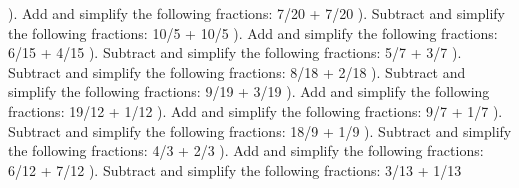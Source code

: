 \documentclass{article}%
\begin{document}
\newline%
\newline%
). Add and simplify the following fractions: 7/20 + 7/20%
\newline%
\newline%
). Subtract and simplify the following fractions: 10/5 + 10/5%
\newline%
\newline%
). Add and simplify the following fractions: 6/15 + 4/15%
\newline%
\newline%
). Subtract and simplify the following fractions: 5/7 + 3/7%
\newline%
\newline%
). Subtract and simplify the following fractions: 8/18 + 2/18%
\newline%
\newline%
). Subtract and simplify the following fractions: 9/19 + 3/19%
\newline%
\newline%
). Add and simplify the following fractions: 19/12 + 1/12%
\newline%
\newline%
). Add and simplify the following fractions: 9/7 + 1/7%
\newline%
\newline%
). Subtract and simplify the following fractions: 18/9 + 1/9%
\newline%
\newline%
). Subtract and simplify the following fractions: 4/3 + 2/3%
\newline%
\newline%
). Add and simplify the following fractions: 6/12 + 7/12%
\newline%
\newline%
). Subtract and simplify the following fractions: 3/13 + 1/13%
\newline%
\newline%
\end{document}

